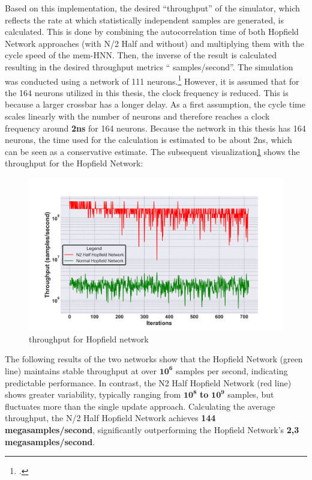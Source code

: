 Based on this implementation, the desired ``throughput'' of the simulator, which reflects the rate at which statistically independent samples are generated, is calculated.
This is done by combining the autocorrelation time of both Hopfield Network approaches (with N/2 Half and without) and multiplying them with the cycle speed of the \ac{mem-HNN}.
Then, the inverse of the result is calculated resulting in the desired throughput metrics `` samples/second''.
The simulation was conducted using a network of 111 neurons.\footcite[cf.][4]{hizzaniMemristorbasedHardwareAlgorithms2023}
However, it is assumed that for the 164 neurons utilized in this thesis, the clock frequency is reduced.
This is because a larger crossbar has a longer delay.
As a first assumption, the cycle time scales linearly with the number of neurons and therefore reaches a clock frequency around \textbf{2ns} for 164 neurons.
Because the network in this thesis has 164 neurons, the time used for the calculation is estimated to be about 2ns, which can be seen as a conservative estimate.
The subsequent visualization\ref{Throughput comparison} shows the throughput for the Hopfield Network:
\begin{figure}[H]
    \centering
    \includegraphics[width=0.7\linewidth]{graphics/Visualisierungen_throughput_log_2.png}
    \caption{throughput for Hopfield network}
    \label{Throughput comparison}
\end{figure}
The following results of the two networks show that the Hopfield Network (green line) maintains stable throughput at over \(\mathbf{10^6}\) samples per second, indicating predictable performance.
In contrast, the N2 Half Hopfield Network (red line) shows greater variability, typically ranging from \(\mathbf{10^8}\) \textbf{to} \(\mathbf{10^9}\) samples, but fluctuates more than the single update approach.
Calculating the average throughput, the N/2 Half Hopfield Network achieves \textbf{144 megasamples/second}, significantly outperforming the Hopfield Network's \textbf{2,3 megasamples/second}.
